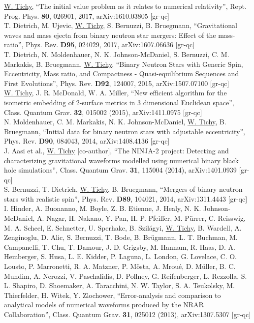 \documentclass[11pt]{article}
\begin{document}
\underline{W. Tichy},
``The initial value problem as it relates to numerical relativity'',
Rept. Prog. Phys. {\bf 80}, 026901, 2017,
arXiv:1610.03805 [gr-qc]
\\

T. Dietrich, M. Ujevic, \underline{W. Tichy}, S. Bernuzzi, B. Bruegmann,
``Gravitational waves and mass ejecta from binary neutron star mergers:
Effect of the mass-ratio'',
Phys. Rev. {\bf D95}, 024029, 2017,     
arXiv:1607.06636 [gr-qc]
\\

T. Dietrich, N. Moldenhauer, N. K. Johnson-McDaniel, S. Bernuzzi,
C. M. Markakis, B. Bruegmann, \underline{W. Tichy},
``Binary Neutron Stars with Generic Spin, Eccentricity, Mass ratio, and       
Compactness - Quasi-equilibrium Sequences and First Evolutions'',
Phys. Rev. {\bf D92}, 124007, 2015,
arXiv:1507.07100 [gr-qc]
\\

\underline{W. Tichy}, J. R. McDonald, W. A. Miller,
``New efficient algorithm for the isometric embedding of
2-surface metrics in 3 dimensional Euclidean space'',
Class. Quantum Grav. {\bf 32}, 015002 (2015),
arXiv:1411.0975 [gr-qc]
\\

N. Moldenhauer, C. M. Markakis, N. K. Johnson-McDaniel,
\underline{W. Tichy}, B. Bruegmann,
``Initial data for binary neutron stars with adjustable eccentricity'',
Phys. Rev. {\bf D90}, 084043, 2014,
arXiv:1408.4136 [gr-qc]
\\

J. Aasi et al., \underline{W. Tichy} [co-author],
``The NINJA-2 project: Detecting and characterizing gravitational waveforms
modelled using numerical binary black hole simulations'',
Class. Quantum Grav. {\bf 31}, 115004 (2014),
arXiv:1401.0939 [gr-qc]
\\

S. Bernuzzi, T. Dietrich, \underline{W. Tichy}, B. Bruegmann,
``Mergers of binary neutron stars with realistic spin'',
Phys. Rev. {\bf D89}, 104021, 2014,
arXiv:1311.4443 [gr-qc]
\\

I. Hinder, A. Buonanno, M. Boyle, Z. B. Etienne, J. Healy,
N. K. Johnson-McDaniel, A. Nagar, H. Nakano, Y. Pan, H. P. Pfeiffer,
M. Pürrer, C. Reisswig, M. A. Scheel, E. Schnetter, U. Sperhake,
B. Szilágyi, \underline{W. Tichy}, B. Wardell, A. Zenginoglu, D. Alic,
S. Bernuzzi, T. Bode, B. Brügmann, L. T. Buchman, M. Campanelli,
T. Chu, T. Damour, J. D. Grigsby, M. Hannam, R. Haas, D. A. Hemberger,
S. Husa, L. E. Kidder, P. Laguna, L. London, G. Lovelace, C. O. Lousto,
P. Marronetti, R. A. Matzner, P. Mösta, A. Mroué, D. Müller, B. C. Mundim,
A. Nerozzi, V. Paschalidis, D. Pollney, G. Reifenberger, L. Rezzolla,
S. L. Shapiro, D. Shoemaker, A. Taracchini, N. W. Taylor, S. A. Teukolsky,
M. Thierfelder, H. Witek, Y. Zlochower,
``Error-analysis and comparison to analytical models of numerical waveforms
produced by the NRAR Collaboration'',
Class. Quantum Grav. {\bf 31}, 025012 (2013), arXiv:1307.5307 [gr-qc]
\\
\end{document}
